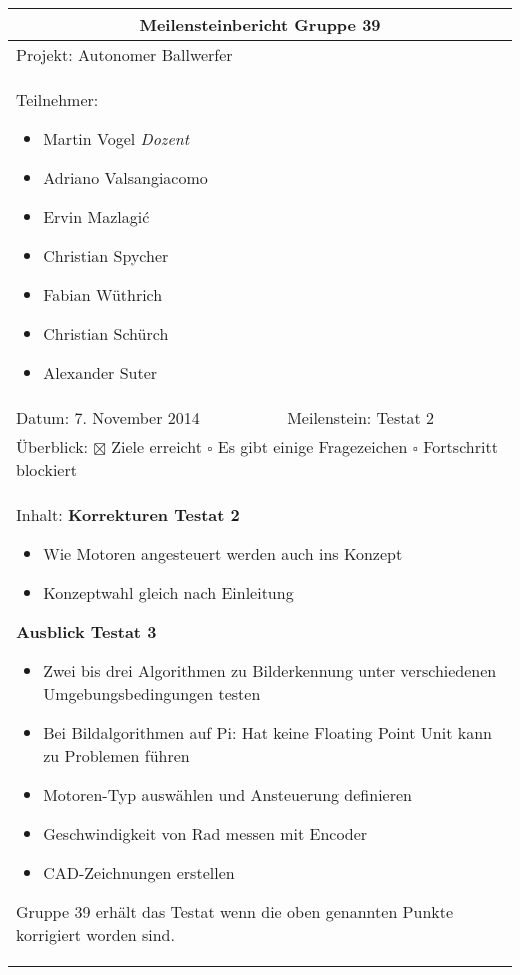 \begin{table}[!h]
	\renewcommand{\arraystretch}{1.5}
	\begin{tabularx}{\linewidth}{|X|X|}
		\hline
		\multicolumn{2}{|c|}{
			\parbox[0pt][3em][c]{0cm}{}
			{\large \textbf{Meilensteinbericht Gruppe 39}}
		} \\
		\hline
		\multicolumn{2}{|l|}{Projekt: Autonomer Ballwerfer} \\
		\hline
		\multicolumn{2}{|p{0.95\textwidth}|}{
			Teilnehmer:
			\begin{itemize}
				\setlength\itemsep{0em}
				\item Martin Vogel \textit{Dozent}
				\item Adriano Valsangiacomo
				\item Ervin Mazlagi\'c
				\item Christian Spycher
				\item Fabian Wüthrich
				\item Christian Schürch
				\item Alexander Suter
			\end{itemize}
		} \\
		\hline
		Datum: 7. November 2014 & Meilenstein: Testat 2 \\
		\hline
		\multicolumn{2}{|p{0.95\textwidth}|}{
			Überblick: \newline
			$\boxtimes$ Ziele erreicht \newline 
			$\square$ Es gibt einige Fragezeichen \newline
			$\square$ Fortschritt blockiert
		} \\
		\hline
		\multicolumn{2}{|p{0.95\textwidth}|}{
			Inhalt: \newline
			\textbf{Korrekturen Testat 2}
			\begin{itemize}
				\item Wie Motoren angesteuert werden auch ins Konzept
				\item Konzeptwahl gleich nach Einleitung
			\end{itemize}
			\textbf{Ausblick Testat 3}
			\begin{itemize}
				\item Zwei bis drei Algorithmen zu Bilderkennung unter verschiedenen Umgebungsbedingungen testen
				\item Bei Bildalgorithmen auf Pi: Hat keine Floating Point Unit kann zu Problemen führen
				\item Motoren-Typ auswählen und Ansteuerung definieren
				\item Geschwindigkeit von Rad messen mit Encoder
				\item CAD-Zeichnungen erstellen
			\end{itemize}
			Gruppe 39 erhält das Testat wenn die oben genannten Punkte korrigiert worden sind.
		} \\
		\hline
	\end{tabularx}
\end{table}
